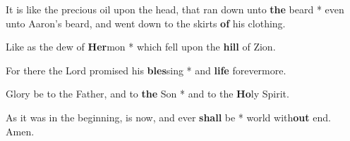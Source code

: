 \begin{multicols}{2}
	It is like the precious oil upon the head, that ran down unto \textbf{the} beard * even unto Aaron's beard, and went down to the skirts \textbf{of} his clothing.
	
	Like as the dew of \textbf{Her}mon * which fell upon the \textbf{hill} of Zion.
	
	For there the Lord promised his \textbf{bles}sing * and \textbf{life} forevermore.
	
	Glory be to the Father, and to \textbf{the} Son * and to the \textbf{Ho}ly Spirit.
	
	As it was in the beginning, is now, and ever \textbf{shall} be * world with\textbf{out} end. Amen.
\end{multicols}